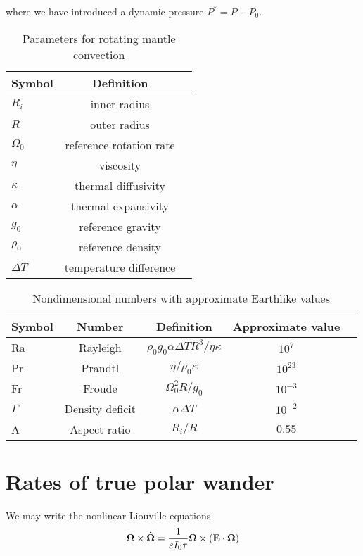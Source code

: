 \documentclass[extra]{gji}
\begin{document}
where we have introduced a dynamic pressure $P^* = P - P_0$.

\begin{table}
\caption{Parameters for rotating mantle convection}
\label{parameters}
\begin{tabular}{@{}lcc}
Symbol & Definition\\
\hline
$R_i$ & inner radius \\
$R$ & outer radius \\
$\Omega_0$ & reference rotation rate \\
$\eta$ & viscosity \\
$\kappa$ & thermal diffusivity \\
$\alpha$ & thermal expansivity \\
$g_0$ & reference gravity \\
$\rho_0$ & reference density \\
$\Delta T$ & temperature difference \\ 
\end{tabular}
\end{table}

\begin{table}
\caption{Nondimensional numbers with approximate Earthlike values}
\label{nondim}
\begin{tabular}{@{}lcccc}
Symbol &  Number & Definition & Approximate value \\
\hline
Ra & Rayleigh &  $\rho_0 g_0 \alpha \Delta T R^3/\eta \kappa$ & $10^7$\\
Pr & Prandtl & $\eta/\rho_0 \kappa$ & $10^{23}$ \\
Fr & Froude & $\Omega_0^2 R/g_0$ & $10^{-3}$ \\
$\Gamma$ & Density deficit & $\alpha \Delta T$ & $10^{-2}$ \\
A & Aspect ratio & $R_i/R$ & $0.55$ \\
\end{tabular}
\end{table}
 



\section{Rates of true polar wander}

We may write the nonlinear Liouville equations 
\begin{equation}
{\bf \Omega} \times {\bf \dot{\Omega} } = \frac{1}{\varepsilon I_0 \tau} {\bf \Omega} \times \left( {\bf E \cdot \Omega} \right)
\end{equation}
\end{document}
